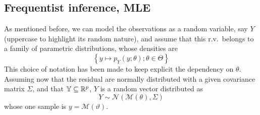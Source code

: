 \documentclass[../../Main_ManuscritThese.tex]{subfiles}
\begin{document}
\subsection{Frequentist inference, MLE}
\label{sec:frequentist_inference_MLE}
As mentioned before, we can model the observations as a random
variable, say $Y$ (uppercase to highlight its random nature), and
assume that this r.v.\ belongs to a family of parametric
distributions, whose densities are
\begin{equation}
  \label{eq:family_pdf}
  \left\{y\mapsto p_{Y}(y; \theta) ; \theta\in\Theta \right\}
\end{equation}
This choice of notation has been made to keep explicit the dependency
on $\theta$. Assuming now that the residual are normally distributed
with a given covariance matrix $\Sigma$, and that
$\mathbb{Y} \subseteq \mathbb{R}^p$, $Y$ is a random vector distributed
as
\begin{equation}
  \label{eq:lik_gaussian}
  Y  \sim \mathcal{N}(\mathcal{M}(\theta), \Sigma)
\end{equation}
whose one sample is $y=\mathscr{M}(\vartheta)$.
\end{document}
